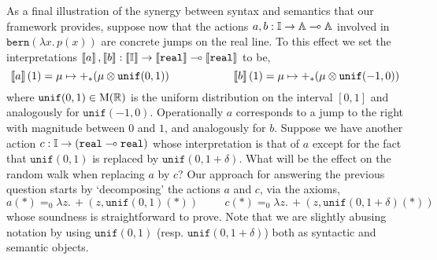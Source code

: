 \documentclass[a4paper,UKenglish,cleveref, autoref, thm-restate]{lipics-v2021}
\begin{document}
\begin{example}
        As a final illustration of the synergy between syntax and semantics
        that our framework provides, suppose now that the actions $a,b : \mathbb{I}
        \to \mathbb{A} \multimap \mathbb{A}$ involved in $\mathtt{bern}(\lambda x. \,
        p(x))$ are concrete jumps on the real line. To this effect we set the
        interpretations $\left \llbracket a \right \rrbracket,\left \llbracket b \right \rrbracket : \left \llbracket \mathbb{I} \right \rrbracket \to
        \left \llbracket \mathtt{real} \right \rrbracket \multimap \left \llbracket \mathtt{real} \right \rrbracket$ to be,
        \[
                        \left \llbracket a \right \rrbracket(1)= \mu \mapsto +_\ast(\mu \otimes \mathtt{unif}(0,1))
                        \hspace{2cm}
                        \left \llbracket b \right \rrbracket(1) =\mu \mapsto +_\ast(\mu \otimes \mathtt{unif}(-1,0))
        \]
        where $\mathtt{unif}(0,1) \in \mathrm{M}(\mathbb{R})$ is the uniform
        distribution on the interval $[0,1]$ and analogously for
        $\mathtt{unif}(-1,0)$.  Operationally $a$ corresponds to a jump to the
        right with magnitude between $0$ and $1$, and analogously for $b$.
        Suppose we have another action $c : \mathbb{I} \to (\mathtt{real} \multimap
        \mathtt{real})$ whose interpretation is that of $a$ except for the fact
        that $\mathtt{unif}(0,1)$ is replaced by $\mathtt{unif}(0,1+\delta)$.
        What will be the effect on the random walk when replacing $a$ by $c$?
        Our approach for answering the previous question starts by
        `decomposing' the actions $a$ and $c$, via the axioms,
        \[
                a(\ast) =_0 \lambda z. \, +(z, \mathtt{unif}(0,1)(\ast))
                \hspace{1cm}
                c(\ast) =_0 \lambda z. \, +(z, \mathtt{unif}(0,1 + \delta)(\ast))
        \]
        whose soundness is straightforward to prove. Note that we are slightly
        abusing notation by using $\mathtt{unif}(0,1)$ (resp.
        $\mathtt{unif}(0,1+\delta)$) both as syntactic and semantic objects.


\end{example}
\end{document}
